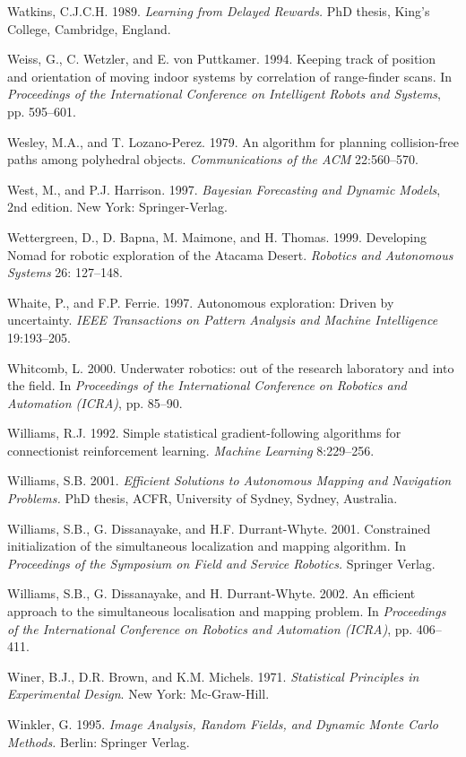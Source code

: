 \documentclass[10pt,a4paper]{article}
\begin{document}
Watkins, C.J.C.H. 1989. \textit{Learning from Delayed Rewards.} PhD thesis, King’s College,
Cambridge, England.

Weiss, G., C. Wetzler, and E. von Puttkamer. 1994. Keeping track of position and
orientation of moving indoor systems by correlation of range-finder scans. In \textit{Proceedings
of the International Conference on Intelligent Robots and Systems}, pp. 595–601.

Wesley, M.A., and T. Lozano-Perez. 1979. An algorithm for planning collision-free
paths among polyhedral objects. \textit{Communications of the ACM} 22:560–570.

West, M., and P.J. Harrison. 1997. \textit{Bayesian Forecasting and Dynamic Models}, 2nd edition.
New York: Springer-Verlag.

Wettergreen, D., D. Bapna, M. Maimone, and H. Thomas. 1999. Developing Nomad
for robotic exploration of the Atacama Desert. \textit{Robotics and Autonomous Systems} 26:
127–148.

Whaite, P., and F.P. Ferrie. 1997. Autonomous exploration: Driven by uncertainty.
\textit{IEEE Transactions on Pattern Analysis and Machine Intelligence} 19:193–205.

Whitcomb, L. 2000. Underwater robotics: out of the research laboratory and into the
field. In \textit{Proceedings of the International Conference on Robotics and Automation (ICRA)},
pp. 85–90.

Williams, R.J. 1992. Simple statistical gradient-following algorithms for connectionist
reinforcement learning. \textit{Machine Learning} 8:229–256.

Williams, S.B. 2001. \textit{Efficient Solutions to Autonomous Mapping and Navigation Problems.}
PhD thesis, ACFR, University of Sydney, Sydney, Australia.

Williams, S.B., G. Dissanayake, and H.F. Durrant-Whyte. 2001. Constrained initialization
of the simultaneous localization and mapping algorithm. In \textit{Proceedings of
the Symposium on Field and Service Robotics.} Springer Verlag.

Williams, S.B., G. Dissanayake, and H. Durrant-Whyte. 2002. An efficient approach
to the simultaneous localisation and mapping problem. In \textit{Proceedings of the International
Conference on Robotics and Automation (ICRA)}, pp. 406–411.

Winer, B.J., D.R. Brown, and K.M. Michels. 1971. \textit{Statistical Principles in Experimental
Design}. New York: Mc-Graw-Hill.

Winkler, G. 1995. \textit{Image Analysis, Random Fields, and Dynamic Monte Carlo Methods.}
Berlin: Springer Verlag.
\end{document}
